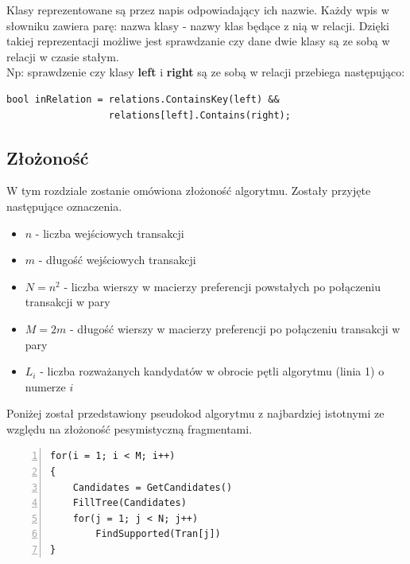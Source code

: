 \documentclass[a4paper,12pt]{article}
\begin{document}
Klasy reprezentowane są przez napis odpowiadający ich nazwie. Każdy wpis w słowniku zawiera parę: nazwa klasy - nazwy klas będące z nią w relacji. Dzięki takiej reprezentacji możliwe jest sprawdzanie czy dane dwie klasy są ze sobą w relacji w czasie stałym. \\

Np: sprawdzenie czy klasy {\bf left} i {\bf right} są ze sobą w relacji przebiega następująco:
\begin{center}
\begin{lstlisting}
bool inRelation = relations.ContainsKey(left) && 
				  relations[left].Contains(right);
\end{lstlisting}
\end{center}

\subsection{Złożoność}
W tym rozdziale zostanie omówiona złożoność algorytmu. Zostały przyjęte następujące oznaczenia.
\begin{itemize}
\item $ n$ - liczba wejściowych transakcji
\item $ m$ - długość wejściowych transakcji
\item $ N = n^2$ - liczba wierszy w macierzy preferencji powstałych po połączeniu transakcji w pary
\item $ M = 2m$ - długość wierszy w macierzy preferencji po połączeniu transakcji w pary
\item $ L_i$ - liczba rozważanych kandydatów w obrocie pętli algorytmu (linia 1) o numerze $i$
\end{itemize}
Poniżej został przedstawiony pseudokod algorytmu z najbardziej istotnymi ze względu na złożoność pesymistyczną fragmentami.

\begin{center}
\begin{lstlisting}[numbers=left]
for(i = 1; i < M; i++)
{
	Candidates = GetCandidates()
	FillTree(Candidates)
	for(j = 1; j < N; j++)
		FindSupported(Tran[j])
}
\end{lstlisting}
\end{center}
\end{document}
